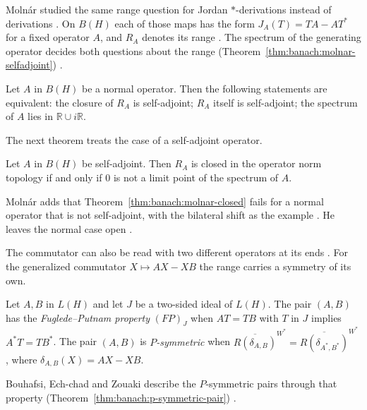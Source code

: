 Moln\'ar studied the same range question for Jordan $*$-derivations instead of
derivations \cite[p.~691]{Molnar1994Range}. On $B(H)$ each of those maps has
the form $J_A(T)=TA-AT^*$ for a fixed operator $A$, and $R_A$ denotes its
range \cite[p.~692]{Molnar1994Range}. The spectrum of the generating operator
decides both questions about the range
(Theorem~\ref{thm:banach:molnar-selfadjoint}) \cite[p.~692]{Molnar1994Range}.

\begin{theorem}\label{thm:banach:molnar-selfadjoint}
Let $A$ in $B(H)$ be a normal operator. Then the following statements are
equivalent: the closure of $R_A$ is self-adjoint; $R_A$ itself is self-adjoint;
the spectrum of $A$ lies in $\mathbb{R}\cup i\mathbb{R}$.
\end{theorem}

The next theorem treats the case of a self-adjoint operator.

\begin{theorem}\label{thm:banach:molnar-closed}
Let $A$ in $B(H)$ be self-adjoint. Then $R_A$ is closed in the operator norm
topology if and only if $0$ is not a limit point of the spectrum of $A$.
\end{theorem}

Moln\'ar adds that Theorem~\ref{thm:banach:molnar-closed} fails for a normal
operator that is not self-adjoint, with the bilateral shift as the example
\cite[Remark~2, p.~694]{Molnar1994Range}. He leaves the normal case open
\cite[p.~694]{Molnar1994Range}.

The commutator can also be read with two different operators at its ends
\cite[p.~145]{BouhafsiEchChadZouaki2022}. For the generalized commutator
$X\mapsto AX-XB$ the range carries a symmetry of its own.

\begin{definition}\label{def:banach:p-symmetric-pair}
Let $A,B$ in $L(H)$ and let $J$ be a two-sided ideal of $L(H)$. The pair
$(A,B)$ has the \emph{Fuglede--Putnam property} $(FP)_J$ when $AT=TB$ with $T$
in $J$ implies $A^*T=TB^*$. The pair $(A,B)$ is \emph{$P$-symmetric} when
$\overline{R(\delta_{A,B})}^{W^*}=\overline{R(\delta_{A^*,B^*})}^{W^*}$,
where $\delta_{A,B}(X)=AX-XB$.
\end{definition}

Bouhafsi, Ech-chad and Zouaki describe the $P$-symmetric pairs through that
property (Theorem~\ref{thm:banach:p-symmetric-pair})
\cite[p.~149]{BouhafsiEchChadZouaki2022}.

